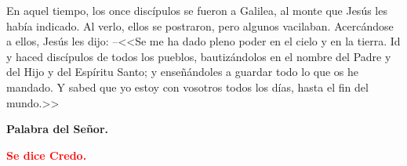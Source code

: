 \documentclass[12pt, letterpaper, spanish]{report}
\begin{document}
\Large En aquel tiempo, los once disc\'ipulos se fueron a Galilea, al monte que Jes\'us les 
hab\'ia indicado. \hfill \break
Al verlo, ellos se postraron, pero algunos vacilaban. \newline
Acerc\'andose a ellos, Jes\'us les dijo: \newline
--<<Se me ha dado pleno poder en el cielo y en la tierra. \newline
Id y haced disc\'ipulos de todos los pueblos, bautiz\'andolos en el nombre del Padre y del Hijo y 
del Esp\'iritu Santo; y ense\~n\'andoles a guardar todo lo que os he mandado. \newline
Y sabed que yo estoy con vosotros todos los d\'ias, hasta el fin del mundo.>> \newline

{\bfseries Palabra del Se\~nor.} \newline

\begin{center} 
\Large {\bfseries \textcolor{red}{Se dice Credo.}} \newline
\end{center}



\end{document}

